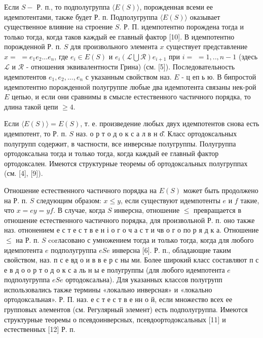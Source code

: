 \documentclass[10pt]{article}
\begin{document}
Если $S-$ Р. п., то подполугруппа $\langle E(S)\rangle$, порожденная всеми ее идемпотентами, также будет Р. п. Подполугруппа $\langle E(S)\rangle$ оказывает существенное влияние на строение $S$. Р. П. идемпотентно порождена тогда и только тогда, когда таков каждый ее главный фактор [10]. В идемпотентно порожденной Р. п. $S$ для произвольного элемента $x$ существует представление $x=$ $=e_{1} e_{2} \ldots e_{n}$, где $e_{i} \in E(S)$ и $e_{i}(\mathscr{L} \bigcup \mathscr{R}) e_{i+1}$ при $i=$ $=1, . ., n-1$ (здесь $\mathscr{L}$ и $\mathscr{R}$ - отношения эквивалентности Грина) (см. [5]). Последовательность идемпотентов $e_{1}, e_{2}, \ldots, e_{n}$ с указанным свойством наз. $E$ - ц еп ь ю. В бипростой идемпотентно порожденной полугруппе любые два идемпотента связаны нек-рой $E$ цепью, и если они сравнимы в смысле естественного частичного порядка, то длина такой цепи $\geqslant 4$.



Если $\langle E(S)\rangle=E(S)$, т. е. произведение любых двух идемпотентов снова есть идемпотент, то Р. п. $S$ наз. о р т о д о к с а л в н о̆̈̈. Класс ортодоксальных полугрупп содержит, в частности, все инверсные полугруппы. Полугруппа ортодоксальна тогда и только тогда, когда каждый ее главный фактор ортодоксален. Имеются структурные теоремы об ортодоксальных полугруппах (см. [4], [9]).



Отношение естественного частичного порядка на $E(S)$ может быть продолжено на Р. п. $S$ следующим образом: $x \leqslant y$, если существуют идемпотенты $e$ и $f$ такие, что $x=e y=y f$. В случае, когда $S$ инверсна, отношение $\leqslant$ превращается в отношение естественного частичного порядка, для произвольной Р. п. оно также наз. отнонением е с т е с т в е н і о г о ч а с т и чв о г о по р я д к а. Отношение $\leqslant$ на Р. п. $S$ corласовано с умножением тогда и только тогда, когда для любого идемпотента $e$ подполугруппа $e S e$ инверсна [6]. Р. п., обладающие таким свойством, наз. п с е вд о и в в е р с ны ми. Более широкий класс составляют п с е в д о о р т о д о к с а ль н ы е полугруппы (для любого идемпотента $e$ подполугруппа $e S e$ ортодоксальна). Для указанных классов полугрупп использовались также термины «локально инверсная» и «локально ортодоксальная». Р. П. наз. е с т е с т в е нн о й, если множество всех ее групповых әлементов (см. Регулярный элемент) есть подполугруппа. Имеются структурные теоремы о псевдоинверсных, псевдоортодоксальных [11] и естественных [12] Р. п.
\end{document}
